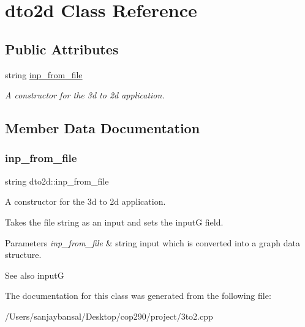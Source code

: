 \hypertarget{classdto2d}{}\section{dto2d Class Reference}
\label{classdto2d}
\subsection*{Public Attributes}
\begin{DoxyCompactItemize}
\item 
string \mbox{\hyperlink{classdto2d_af565af1855741306182c923a3da25d55}{inp\+\_\+from\+\_\+file}}
\begin{DoxyCompactList}\small\item\em A constructor for the 3d to 2d application. \end{DoxyCompactList}\end{DoxyCompactItemize}


\subsection{Member Data Documentation}
\mbox{\label{classdto2d_af565af1855741306182c923a3da25d55}} 
\subsubsection{\texorpdfstring{inp\+\_\+from\+\_\+file}{inp\_from\_file}}
{\footnotesize\ttfamily string dto2d\+::inp\+\_\+from\+\_\+file}



A constructor for the 3d to 2d application. 

Takes the file string as an input and sets the inputG field. 
\begin{DoxyParams}{Parameters}
{\em inp\+\_\+from\+\_\+file} & string input which is converted into a graph data structure. \\
\hline
\end{DoxyParams}
\begin{DoxySeeAlso}{See also}
inputG 
\end{DoxySeeAlso}


The documentation for this class was generated from the following file\+:\begin{DoxyCompactItemize}
\item 
/\+Users/sanjaybansal/\+Desktop/cop290/project/3to2.\+cpp\end{DoxyCompactItemize}
